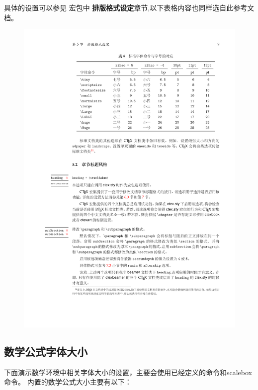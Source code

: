 \documentclass[fontset=windows, 12pt]{article}
\begin{document}
\newpage
具体的设置可以参见 \CTeX 宏包中 \textbf{排版格式设定}章节,以下表格内容也同样选自此参考文档。
\begin{figure}[!htb]
    \includegraphics[scale=1]{../Pic/字号.pdf}
    \label{zihao}
\end{figure}

\subsection*{数学公式字体大小}
下面演示数学环境中相关字体大小的设置，主要会使用已经定义的命令和scalebox命令。
内置的数学公式大小主要有以下：
\end{document}
